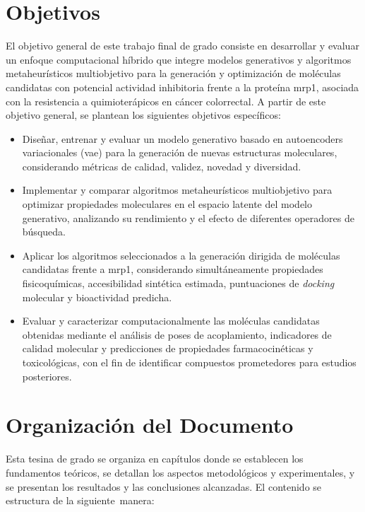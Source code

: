 \section{Objetivos}
\label{sec:objetivos}

El objetivo general de este trabajo final de grado consiste en desarrollar y evaluar un enfoque computacional híbrido que integre modelos generativos y algoritmos metaheurísticos multiobjetivo para la generación y optimización de moléculas candidatas con potencial actividad inhibitoria frente a la proteína \gls{mrp1}, asociada con la resistencia a quimioterápicos en cáncer colorrectal. A partir de este objetivo general, se plantean los siguientes objetivos específicos:

\begin{itemize}
    \item Diseñar, entrenar y evaluar un modelo generativo basado en autoencoders variacionales (\gls{vae}) para la generación de nuevas estructuras moleculares, considerando métricas de calidad, validez, novedad y diversidad.
    \item Implementar y comparar algoritmos metaheurísticos multiobjetivo para optimizar propiedades moleculares en el espacio latente del modelo generativo, analizando su rendimiento y el efecto de diferentes operadores de búsqueda.
    \item Aplicar los algoritmos seleccionados a la generación dirigida de moléculas candidatas frente a \gls{mrp1}, considerando simultáneamente propiedades fisicoquímicas, accesibilidad sintética estimada, puntuaciones de \textit{docking} molecular y bioactividad predicha.
    \item Evaluar y caracterizar computacionalmente las moléculas candidatas obtenidas mediante el análisis de poses de acoplamiento, indicadores de calidad molecular y predicciones de propiedades farmacocinéticas y toxicológicas, con el fin de identificar compuestos prometedores para estudios posteriores.
\end{itemize}

\section{Organización del Documento}
\label{sec:organizacion}

Esta tesina de grado se organiza en capítulos donde se establecen los fundamentos teóricos, se detallan los aspectos metodológicos y experimentales, y se presentan los resultados y las conclusiones alcanzadas. El contenido se estructura de la siguiente~manera:

